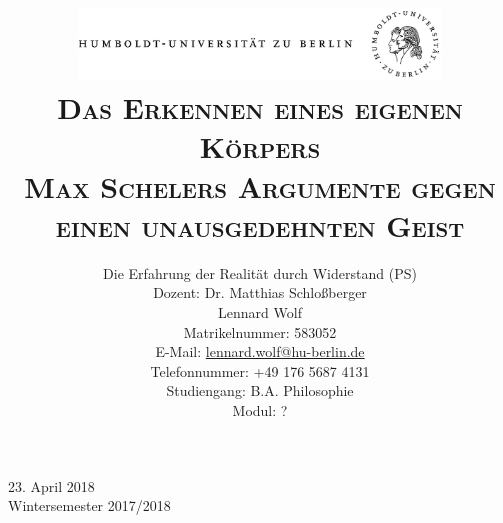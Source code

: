 \documentclass[a4paper, 12pt]{article}
\date{\vspace{-3ex}}
\begin{document}
\title{\vspace{5ex}
	\includegraphics*[bb=0 0 720 200, width=0.72\textwidth]{ErstesSem/images/hu_logo.png}\\
	\vspace{30pt}
	\scshape\LARGE{Das Erkennen eines eigenen Körpers
}\\\vspace{5pt}\Large{Max Schelers Argumente gegen einen unausgedehnten Geist}\\\vspace{20pt}}
	


\author{Die Erfahrung der Realität durch Widerstand (PS)\\
	\vspace{7pt}
          Dozent: Dr. Matthias Schloßberger\\\vspace{4pt}Lennard Wolf\\
        \small{Matrikelnummer: 583052}\\
        \small{E-Mail: \href{mailto:lennard.wolf@hu-berlin.de}{lennard.wolf@hu-berlin.de}}\\
        \small{Telefonnummer: +49 176 5687 4131}\\
        \small{Studiengang: B.A. Philosophie}\\
        \small{Modul: ?}}

\maketitle

\vspace{\fill}

\begin{minipage}[]{0.92\textwidth}
    \centering
    \onehalfspacing
    \large   
    23. April 2018\\
    Wintersemester 2017/2018

    \vspace{-20mm} 
\end{minipage}%
\thispagestyle{empty}
\newpage
\setcounter{page}{1}
\end{document}
